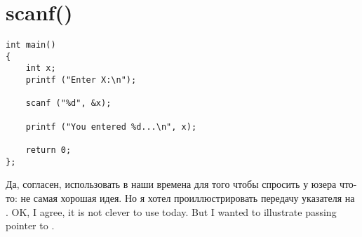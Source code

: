 ﻿\section{scanf()}


\begin{lstlisting}
int main() 
{
	int x;
	printf ("Enter X:\n");

	scanf ("%d", &x);

	printf ("You entered %d...\n", x);

	return 0;
};
\end{lstlisting}

\IFRU
{Да, согласен, использовать \scanf в наши времена для того чтобы спросить у юзера что-то: не самая хорошая идея.
Но я хотел проиллюстрировать передачу указателя на \Tint.}
{OK, I agree, it is not clever to use \scanf today. But I wanted to illustrate passing pointer to \Tint.}








